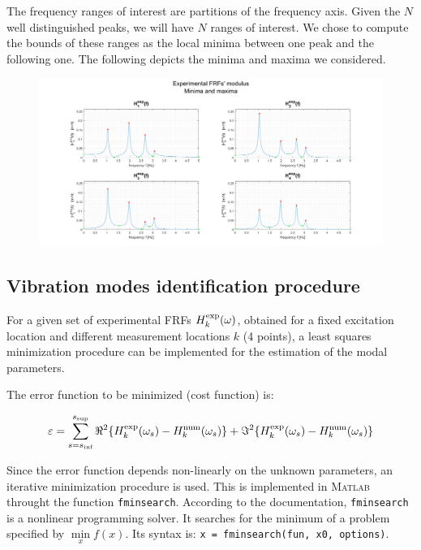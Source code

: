 \documentclass[a4paper,12pt,oneside]{article}
\begin{document}
The frequency ranges of interest are partitions of the frequency axis. Given the $ N $ well distinguished peaks, we will have $ N $ ranges of interest. We chose to compute the bounds of these ranges as the local minima between one peak and the following one. The following depicts the minima and maxima we considered.

\begin{figure}[h]
	\hspace{-70pt}
	\includegraphics[scale=0.4]{experimental_frfs_modulus_min_max}
\end{figure}

\subsection{Vibration modes identification procedure}

For a given set of experimental FRFs $ H^\textup{exp}_k(\omega) $, obtained for a fixed excitation location and different measurement locations $ k $ (4 points), a least squares minimization procedure can be implemented for the estimation of the modal parameters.

The error function to be minimized (cost function) is:

\[
	\varepsilon = \sum_{s=s_\textup{inf}}^{s_\textup{sup}}
		\Re^2\{H^\textup{exp}_k(\omega_s) - H^\textup{num}_k(\omega_s)\} +
		\Im^2\{H^\textup{exp}_k(\omega_s) - H^\textup{num}_k(\omega_s)\}
\]

Since the error function depends non-linearly on the unknown parameters, an iterative
minimization procedure is used. This is implemented in \textsc{Matlab} throught the function \lstinline!fminsearch!. According to the documentation, \lstinline!fminsearch! is a nonlinear programming solver. It searches for the minimum of a problem specified by $ \min\limits_x f(x) $. Its syntax is: \lstinline!x = fminsearch(fun, x0, options)!.
\end{document}
